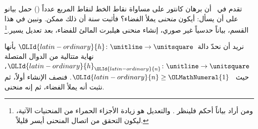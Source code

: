 \documentclass[../../../include/open-logic-section]{subfiles}
\begin{document}


تقدم في~ أن برهان كانتور على مساواة نقاط الخط لنقاط
المربع عدداً () حمل بيانو
على أن يسأل: أيكون \emph{منحنى} يملأ الفضاء؟ فأثبت سنة  أن ذلك ممكن.
ونبين في هذا القسم، بياناً حدسياً غير صوري، إنشاء منحنى هيلبرت المالئ
للفضاء، بعد تعديل يسير.\footnote{ومن أراد بياناً أحكم فلينظر
\cite{Rose2010}. والتعديل هو زيادة الأجزاء الحمراء من المنحنيات الآتية،
ليكون التحقق من اتصال المنحنى أيسر قليلاً.}

نريد أن نحدّ دالة~${\OLId{latin-ordinary}{h}} \colon \unitline \to \unitsquare$ بأنها نهاية
متتالية من الدوال المتصلة ${\OLId{latin-ordinary}{h}}_{\OLId{latin-ordinary}{n}} \colon \unitline \to \unitsquare$، حيث
~${\OLId{latin-ordinary}{n}} \geq {\OLMathNumeral{1}}$. فنصف الإنشاء أولاً، ثم نثبت أنه يملأ الفضاء، ثم إنه منحنى.
\end{document}
